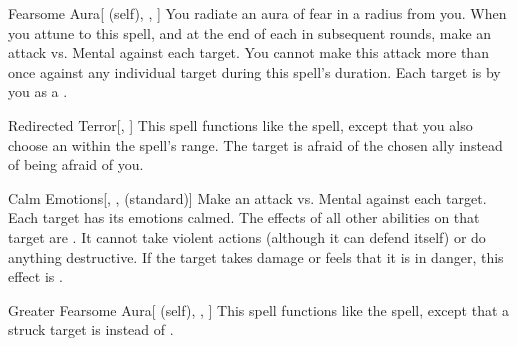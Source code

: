 \lowercase{\hypertarget{spell:Fearsome Aura}{}}\label{spell:Fearsome Aura}
\begin{attuneability}[\nth{2}]{\hypertarget{spell:Fearsome Aura}{Fearsome Aura}}[ (self), , ]
You radiate an aura of fear in a \areamed radius  from you.
When you attune to this spell, and at the end of each  in subsequent rounds, make an attack vs. Mental against each target.
You cannot make this attack more than once against any individual target during this spell's duration.
\hit Each target is  by you as a .
\end{attuneability}
\vspace{0.25em}



\lowercase{\hypertarget{spell:Redirected Terror}{}}\label{spell:Redirected Terror}
\begin{freeability}[\nth{2}]{\hypertarget{spell:Redirected Terror}{Redirected Terror}}[, ]
This spell functions like the  spell, except that you also choose an  within the spell's range.
The target is afraid of the chosen ally instead of being afraid of you.
\end{freeability}
\vspace{0.25em}



\lowercase{\hypertarget{spell:Calm Emotions}{}}\label{spell:Calm Emotions}
\begin{freeability}[\nth{3}]{\hypertarget{spell:Calm Emotions}{Calm Emotions}}[, ,  (standard)]
Make an attack vs. Mental against each target.
\hit Each target has its emotions calmed.
The effects of all other  abilities on that target are .
It cannot take violent actions (although it can defend itself) or do anything destructive.
If the target takes damage or feels that it is in danger, this effect is .
\end{freeability}
\vspace{0.25em}



\lowercase{\hypertarget{spell:Greater Fearsome Aura}{}}\label{spell:Greater Fearsome Aura}
\begin{attuneability}[\nth{4}]{\hypertarget{spell:Greater Fearsome Aura}{Greater Fearsome Aura}}[ (self), , ]
This spell functions like the  spell, except that a struck target is  instead of .
\end{attuneability}
\vspace{0.25em}



